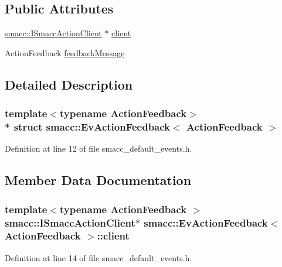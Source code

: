 \subsection*{Public Attributes}
\begin{DoxyCompactItemize}
\item 
\hyperlink{classsmacc_1_1ISmaccActionClient}{smacc\+::\+I\+Smacc\+Action\+Client} $\ast$ \hyperlink{structsmacc_1_1EvActionFeedback_a79bd45568b39330df89f45d138ace141}{client}
\item 
Action\+Feedback \hyperlink{structsmacc_1_1EvActionFeedback_a9e15b2862ee4e7c2e12407cfb3caa800}{feedback\+Message}
\end{DoxyCompactItemize}


\subsection{Detailed Description}
\subsubsection*{template$<$typename Action\+Feedback$>$\\*
struct smacc\+::\+Ev\+Action\+Feedback$<$ Action\+Feedback $>$}



Definition at line 12 of file smacc\+\_\+default\+\_\+events.\+h.



\subsection{Member Data Documentation}
\subsubsection[{\texorpdfstring{client}{client}}]{\setlength{\rightskip}{0pt plus 5cm}template$<$typename Action\+Feedback $>$ {\bf smacc\+::\+I\+Smacc\+Action\+Client}$\ast$ {\bf smacc\+::\+Ev\+Action\+Feedback}$<$ Action\+Feedback $>$\+::client}\hypertarget{structsmacc_1_1EvActionFeedback_a79bd45568b39330df89f45d138ace141}{}\label{structsmacc_1_1EvActionFeedback_a79bd45568b39330df89f45d138ace141}


Definition at line 14 of file smacc\+\_\+default\+\_\+events.\+h.



